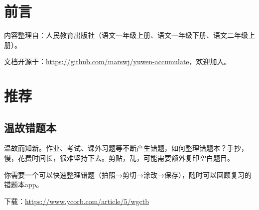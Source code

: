 \chapter{前言}
内容整理自：人民教育出版社（语文一年级上册、语文一年级下册、语文二年级上册）。

文档开源于：\url{https://github.com/marswj/yuwen-accumulate}，欢迎加入。

\chapter{推荐}
\section{温故错题本}
温故而知新。作业、考试、课外习题等不断产生错题，如何整理错题本？手抄，慢，花费时间长，很难坚持下去。剪贴，乱，可能需要额外复印空白题目。

你需要一个可以快速整理错题（拍照→剪切→涂改→保存），随时可以回顾复习的错题本app。

下载：\url{https://www.ycorb.com/article/5/wgctb}